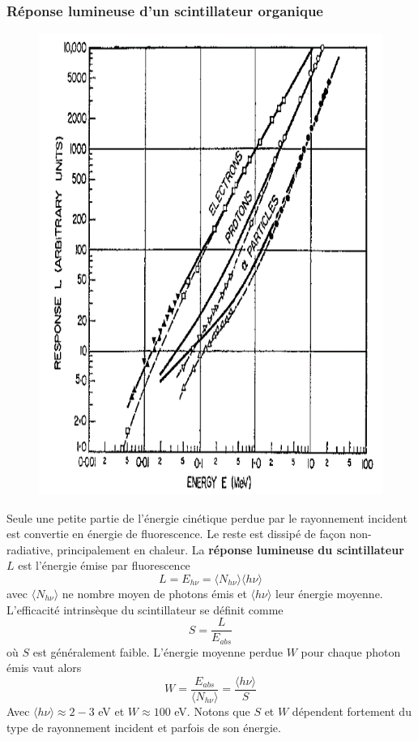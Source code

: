 \subsubsection{Réponse lumineuse d'un scintillateur organique}%
	\begin{figure}
	\vspace{-5mm}
	\includegraphics[scale=0.2]{ch10/image2}
	\end{figure}
Seule une petite partie de l'énergie cinétique perdue par le rayonnement incident est 
convertie en énergie de fluorescence. Le reste est dissipé de façon non-radiative, 
principalement en chaleur. La \textbf{réponse lumineuse du scintillateur} $L$ est l'énergie
émise par fluorescence
\begin{equation}
L=E_{h\nu}=\langle N_{h\nu}\rangle \langle h\nu\rangle
\end{equation}
avec $\langle N_{h\nu}\rangle$ ne nombre moyen de photons émis et $\langle h\nu\rangle$ leur 
énergie moyenne. L'efficacité intrinsèque du scintillateur se définit comme
\begin{equation}
S=\frac{L}{E_{abs}}
\end{equation}
où $S$ est généralement faible. L'énergie moyenne perdue $W$ pour chaque photon émis vaut alors
\begin{equation}
W=\frac{E_{abs}}{\langle N_{h\nu}\rangle}=\frac{\langle h\nu\rangle}{S}
\end{equation}
Avec $\langle h\nu\rangle \approx 2-3$ eV et $W\approx100$ eV. Notons que $S$ et $W$ dépendent
fortement du type de rayonnement incident et parfois de son énergie.\\

